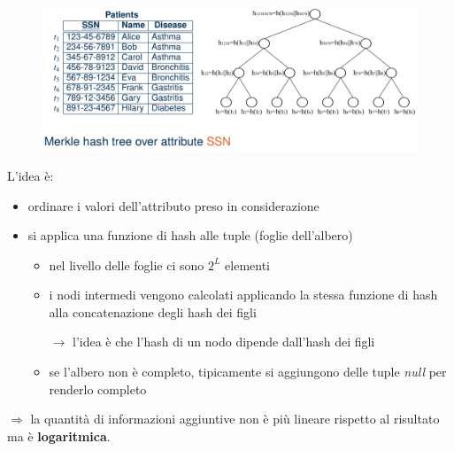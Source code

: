\documentclass{report}
\begin{document}
\begin{figure}[H]
    \centering
    \includegraphics[width=1\linewidth]{images/merkle-hashtree.png}
\end{figure}

L'idea è:
\begin{itemize}
    \item ordinare i valori dell'attributo preso in considerazione
    \item si applica una funzione di hash alle tuple (foglie dell'albero)
    \begin{itemize}
        \item nel livello delle foglie ci sono $2^L$ elementi
        \item i nodi intermedi vengono calcolati applicando la stessa funzione di hash 
        alla concatenazione degli hash dei figli 

        \noindent $\rightarrow$ l'idea è che l'hash di un nodo dipende dall'hash dei figli
        \item se l'albero non è completo, tipicamente si aggiungono delle tuple \textit{null} per renderlo completo 
    \end{itemize}
\end{itemize}

$\Rightarrow$ la quantità di informazioni aggiuntive non è più lineare rispetto al risultato 
ma è \textbf{logaritmica}.
\end{document}
